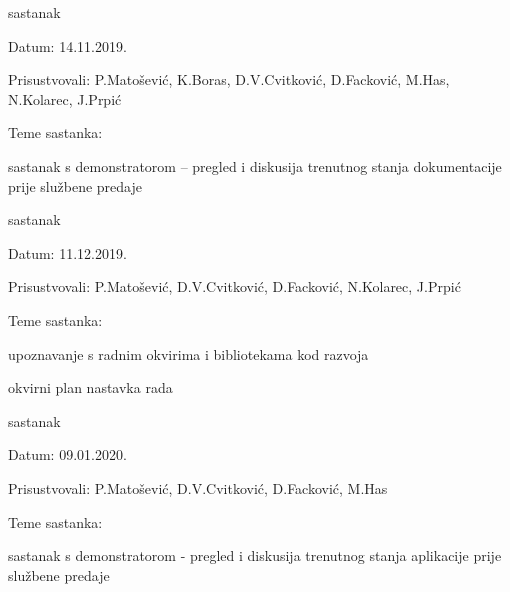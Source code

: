 \begin{packed_enum}
		\item  sastanak
		\item[] \begin{packed_item}
			\item Datum: 14.11.2019.
			\item Prisustvovali: P.Matošević, K.Boras, D.V.Cvitković, D.Facković, M.Has, N.Kolarec, J.Prpić
			\item Teme sastanka:
			\begin{packed_item}
				\item  sastanak s demonstratorom -- pregled i diskusija trenutnog stanja dokumentacije prije službene predaje
			\end{packed_item}
		\end{packed_item}
	
		\item  sastanak
		\item[] \begin{packed_item}
			\item Datum: 11.12.2019.
			\item Prisustvovali: P.Matošević, D.V.Cvitković, D.Facković, N.Kolarec, J.Prpić
			\item Teme sastanka:
			\begin{packed_item}
				\item  upoznavanje s radnim okvirima i bibliotekama kod razvoja
				\item  okvirni plan nastavka rada
			\end{packed_item}
		\end{packed_item}
	
		\item  sastanak
		\item[] \begin{packed_item}
			\item Datum: 09.01.2020.
			\item Prisustvovali: P.Matošević, D.V.Cvitković, D.Facković, M.Has
			\item Teme sastanka:
			\begin{packed_item}
				\item  sastanak s demonstratorom - pregled i diskusija trenutnog stanja aplikacije prije službene predaje
			\end{packed_item}
		\end{packed_item}


%			
%			
			
		\end{packed_enum}
		
